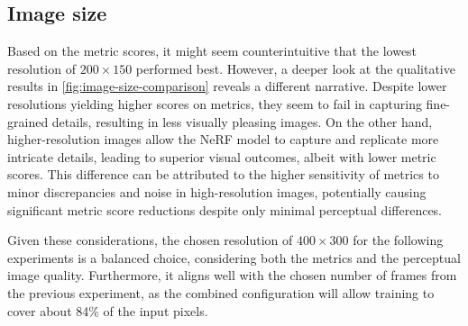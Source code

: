 \subsection{Image size}
Based on the metric scores, it might seem counterintuitive that the lowest resolution of $200 \times 150$ performed best. However, a deeper look at the qualitative results in \autoref{fig:image-size-comparison} reveals a different narrative. Despite lower resolutions yielding higher scores on metrics, they seem to fail in capturing fine-grained details, resulting in less visually pleasing images. On the other hand, higher-resolution images allow the NeRF model to capture and replicate more intricate details, leading to superior visual outcomes, albeit with lower metric scores. This difference can be attributed to the higher sensitivity of metrics to minor discrepancies and noise in high-resolution images, potentially causing significant metric score reductions despite only minimal perceptual differences.

Given these considerations, the chosen resolution of $400 \times 300$ for the following experiments is a balanced choice, considering both the metrics and the perceptual image quality. Furthermore, it aligns well with the chosen number of frames from the previous experiment, as the combined configuration will allow training to cover about 84\% of the input pixels.

